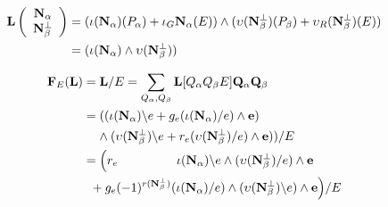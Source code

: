 \documentclass{beamer}
\newcommand{\ext}[1]{\ensuremath{\mathbf{#1}}}
\newcommand{\Is}{\ensuremath{\iota}}
\newcommand{\Vs}{\ensuremath{\upsilon}}
\begin{document}
\begin{frame}

\[
\begin{split}
  \ext{L}\left( \begin{array}{c} \eNal\\ \eNbePe \end{array} \right)
   & = (\Is(\eNal)(P_\alpha) + \Is_G\eNal(E))\wedge(\Vs(\eNbePe)(P_\beta) + \Vs_R(\eNbePe)(E)) \\
  &  = (\Is(\eNal)\wedge\Vs(\eNbePe))
\end{split}
\]

\[
\begin{split}
  \ext{F}_E(\ext{L})& = \ext{L}/E = \sum_{Q_\alpha,Q_\beta}\ext{L}[Q_\alpha Q_\beta E]\ext{Q}_\alpha\ext{Q}_\beta \\
  & =   ((\Is(\eNal)\backslash   e + g_e(\Is(\eNal)/e)\wedge\ext{e})                   \\
  & \;\;\;\;  \wedge  (\Vs(\eNbePe)\backslash e + r_e(\Vs(\eNbePe)/e)\wedge \ext{e}) ) / E \\
  & = \Big( r_e  \;\;\; \;\;\;\;\;\;\;\;\;\;\;\;\;\; \Is(\ext{\eNal})\backslash e\wedge (\Vs(\eNbePe)/e)      \wedge  \ext{e} \\
  & \;\;+ g_e (-1)^{r(\eNbePe)}(\Is(\eNal)/e)\wedge(\Vs(\eNbePe)\backslash e)    \wedge  \ext{e}\Big) / E 
  \end{split}
\]
 

\end{frame}


\newcommand{\eNbe}{\ensuremath{\ext{N}_\beta}}
\end{document}

